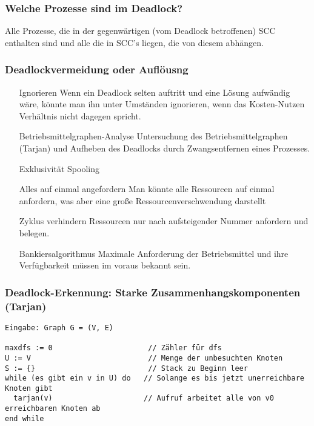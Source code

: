\subsubsection{Welche Prozesse sind im Deadlock?}
Alle Prozesse, die in der gegenwärtigen (vom Deadlock betroffenen) SCC enthalten sind und alle die in SCC's liegen, die von diesem abhängen.

\subsubsection{Deadlockvermeidung oder Auflöusng}
\begin{itemize}
\item[Ignorieren] Wenn ein Deadlock selten auftritt und eine Lösung aufwändig wäre, könnte man ihn unter Umständen ignorieren, wenn das Kosten-Nutzen Verhältnis nicht dagegen spricht.

\item[Betriebsmittelgraphen-Analyse] Untersuchung des Betriebsmittelgraphen (Tarjan) und Aufheben des Deadlocks durch Zwangsentfernen eines Prozesses.

\item[Exklusivität] Spooling

\item[Alles auf einmal angefordern] Man könnte alle Ressourcen auf einmal anfordern, was aber eine große Ressourcenverschwendung darstellt

\item[Zyklus verhindern] Ressourcen nur nach aufsteigender Nummer anfordern und belegen.

\item[Bankiersalgorithmus] Maximale Anforderung der Betriebsmittel und ihre Verfügbarkeit müssen im voraus bekannt sein.
\end{itemize}

\subsubsection{Deadlock-Erkennung: Starke Zusammenhangskomponenten (Tarjan)}
\begin{verbatim}
Eingabe: Graph G = (V, E)

maxdfs := 0                      // Zähler für dfs
U := V                           // Menge der unbesuchten Knoten
S := {}                          // Stack zu Beginn leer
while (es gibt ein v in U) do   // Solange es bis jetzt unerreichbare Knoten gibt
  tarjan(v)                     // Aufruf arbeitet alle von v0 erreichbaren Knoten ab
end while
\end{verbatim}

